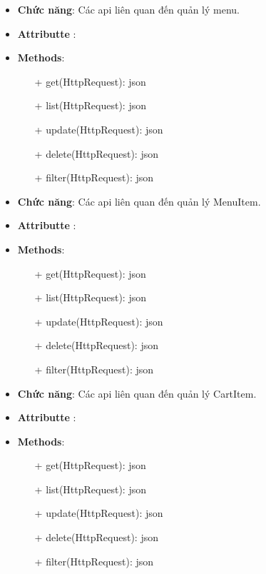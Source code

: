 \begin{itemize}
    \item \textbf{Chức năng}: Các api liên quan đến quản lý menu.
    \item \textbf{Attributte} :
    \item \textbf{Methods}:
    \begin{itemize}
        \item[+] get(HttpRequest): json
        \item[+] list(HttpRequest): json
        \item[+] update(HttpRequest): json
        \item[+] delete(HttpRequest): json
        \item[+] filter(HttpRequest): json
    \end{itemize}
\end{itemize}
\begin{itemize}
    \item \textbf{Chức năng}: Các api liên quan đến quản lý MenuItem.
    \item \textbf{Attributte} :
    \item \textbf{Methods}:
    \begin{itemize}
        \item[+] get(HttpRequest): json
        \item[+] list(HttpRequest): json
        \item[+] update(HttpRequest): json
        \item[+] delete(HttpRequest): json
        \item[+] filter(HttpRequest): json
    \end{itemize}
\end{itemize}
\begin{itemize}
    \item \textbf{Chức năng}: Các api liên quan đến quản lý CartItem.
    \item \textbf{Attributte} :
    \item \textbf{Methods}:
    \begin{itemize}
        \item[+] get(HttpRequest): json
        \item[+] list(HttpRequest): json
        \item[+] update(HttpRequest): json
        \item[+] delete(HttpRequest): json
        \item[+] filter(HttpRequest): json
    \end{itemize}
\end{itemize}
